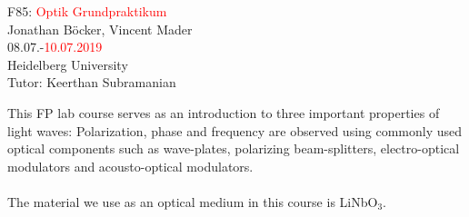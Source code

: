 
\begin{center}
    \null\vspace{15mm}
    \Huge 
    F85: \textcolor{red}{Optik Grundpraktikum} \\
    \vspace{10mm}
    \Large
    Jonathan B\"ocker, Vincent Mader \\
    \vspace{10mm}
    08.07.-\textcolor{red}{10.07.2019} \\
    Heidelberg University \\
    Tutor: Keerthan Subramanian \\
    \vspace{35mm}
\end{center}

\noindent
{}
This FP lab course serves as an introduction to three important properties of
light waves: Polarization, phase and frequency are observed
using commonly used optical components such as wave-plates, polarizing
beam-splitters, electro-optical modulators and acousto-optical modulators. \\
\\ The material we use as an optical medium in this course is LiNbO$_3$.


